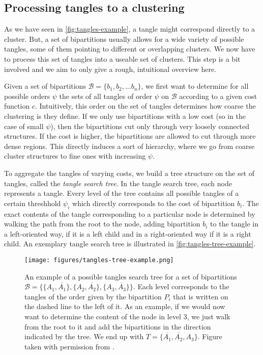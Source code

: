 \subsection{Processing tangles to a clustering}
As we have seen in \autoref{fig:tangles-example}, a tangle might correspond directly to a cluster. But, a set of bipartitions usually allows for a wide 
variety of possible tangles, some of them pointing to different or overlapping clusters. We now have to process this set of tangles into a useable set of clusters.
This step is a bit involved and we aim to only give a rough, intuitional overview here. 

Given a set of bipartitions $\mathcal{B} = \{b_1, b_2, \ldots b_n\} $, we first want to determine for all possible orders $\psi$ the sets of all tangles of order $\psi$ on $\mathcal{B}$ 
according to a given cost function $c$. Intuitively, this order on the set of tangles determines how coarse the clustering is they define.
If we only use bipartitions with a low cost (so in the case of small $\psi$), then the bipartitions cut only through very loosely connected structures. 
If the cost is higher, the bipartitions are allowed to cut through more dense regions. This directly induces a sort of hierarchy, where we go from coarse cluster
structures to fine ones with increasing $\psi$.

To aggregate the tangles of varying costs, we build a tree structure on the set of tangles, called the \textit{tangle search tree}. In the tangle search tree, 
each node represents a tangle. Every level of the tree contains all possible tangles of a certain threshhold $\psi_i$ which directly corresponds to the cost of bipartition $b_i$. 
The exact contents of the tangle corresponding to a particular node is determined by walking the path from the root to the node, adding bipartition $b_i$ to the tangle in a left-oriented way, if it is a left child and in a right-oriented way if it is a right child. An exemplary tangle search tree is illustrated in \autoref{fig:tangles-tree-example}. 

\begin{figure}[h]
    \centering
    \texttt{[image: figures/tangles-tree-example.png]}
    \caption{An example of a possible tangles search tree for a set of bipartitions $\mathcal{B} = \{\{A_1, \overline{A_1}\}, \{A_2, \overline{A_2}\}, \{A_3, \overline{A_3}\} \}$. 
        Each level corresponds to the tangles of the order given by the bipartition $P_i$ that is written on the dashed line to the left of it.
        As an example, if we would now want to determine
        the content of the node in level 3, we just walk from the root to it and add the bipartitions in the direction indicated by the tree. 
        We end up with $T = \{\overline{A_1}, \overline{A_2}, A_3\}$. 
        Figure taken with permission from \cite{klepperClusteringTanglesAlgorithmic2021}.}
    \label{fig:tangles-tree-example}
\end{figure}

